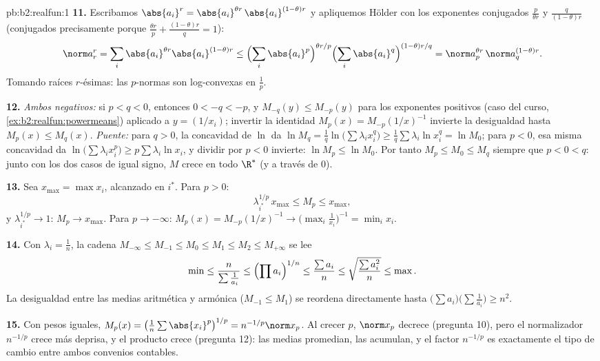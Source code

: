 \begin{solution}{pb:b2:realfun:1}
\textbf{11.} Escribamos $\abs{a_i}^r = \abs{a_i}^{\theta
r}\,\abs{a_i}^{(1-\theta)r}$ y apliquemos Hölder con los exponentes
conjugados $\frac{p}{\theta r}$ y $\frac{q}{(1-\theta)r}$
(conjugados precisamente porque $\frac{\theta r}p +
\frac{(1-\theta)r}q = 1$):
\[
\norm a_r^r = \sum_i \abs{a_i}^{\theta r}\abs{a_i}^{(1-\theta)r}
\leq \Bigl(\sum_i\abs{a_i}^{p}\Bigr)^{\theta r/p}
\Bigl(\sum_i\abs{a_i}^{q}\Bigr)^{(1-\theta)r/q}
= \norm a_p^{\theta r}\,\norm a_q^{(1-\theta)r} .
\]
Tomando raíces $r$-ésimas: las $p$-normas son log-convexas en
$\frac1p$.

\textbf{12.} \emph{Ambos negativos:} si $p < q < 0$, entonces $0 <
-q < -p$, y $M_{-q}(y) \leq M_{-p}(y)$ para los exponentes
positivos (caso del curso, \cref{ex:b2:realfun:powermeans})
aplicado a $y = (1/x_i)$; invertir la identidad $M_p(x) =
M_{-p}(1/x)^{-1}$ invierte la desigualdad hasta $M_p(x) \leq
M_q(x)$. \emph{Puente:} para $q > 0$, la concavidad de $\ln$ da
$\ln M_q = \frac1q\ln\bigl(\sum\lambda_ix_i^q\bigr) \geq
\frac1q\sum\lambda_i\ln x_i^q = \ln M_0$; para $p < 0$, esa misma
concavidad da $\ln\bigl(\sum\lambda_ix_i^p\bigr) \geq
p\sum\lambda_i\ln x_i$, y dividir por $p < 0$ invierte: $\ln M_p
\leq \ln M_0$. Por tanto $M_p \leq M_0 \leq M_q$ siempre que $p < 0
< q$: junto con los dos casos de igual signo, $M$ crece en todo
$\R^*$ (y a través de $0$).

\textbf{13.} Sea $x_{\max} = \max x_i$, alcanzado en $i^*$. Para $p
> 0$:
\[
\lambda_{i^*}^{1/p}\,x_{\max} \leq M_p \leq x_{\max},
\]
y $\lambda_{i^*}^{1/p} \to 1$: $M_p \to x_{\max}$. Para $p \to
-\infty$: $M_p(x) = M_{-p}(1/x)^{-1} \to
\bigl(\max_i\frac1{x_i}\bigr)^{-1} = \min_ix_i$.

\textbf{14.} Con $\lambda_i = \frac1n$, la cadena $M_{-\infty} \leq
M_{-1} \leq M_0 \leq M_1 \leq M_2 \leq M_{+\infty}$ se lee
\[
\min \leq \frac{n}{\sum\frac1{a_i}} \leq \Bigl(\prod
a_i\Bigr)^{1/n} \leq \frac{\sum a_i}{n} \leq
\sqrt{\frac{\sum a_i^2}{n}} \leq \max .
\]
La desigualdad entre las medias aritmética y armónica ($M_{-1} \leq
M_1$) se reordena directamente hasta $\bigl(\sum
a_i\bigr)\bigl(\sum\frac1{a_i}\bigr) \geq n^2$.

\textbf{15.} Con pesos iguales, $M_p(x) =
\bigl(\frac1n\sum\abs{x_i}^p\bigr)^{1/p} = n^{-1/p}\norm x_p$. Al
crecer $p$, $\norm x_p$ decrece (pregunta 10), pero el normalizador
$n^{-1/p}$ crece más deprisa, y el producto crece (pregunta 12):
las medias promedian, las  acumulan, y el factor $n^{-1/p}$
es exactamente el tipo de cambio entre ambos convenios contables.


\end{solution}
